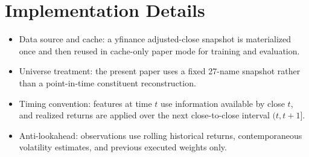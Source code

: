 \documentclass[10pt,twocolumn]{article}
\begin{document}
\section{Implementation Details}
\label{app:implementation_details}
\begin{itemize}[leftmargin=*,itemsep=1pt]
\item Data source and cache: a yfinance adjusted-close snapshot is materialized once and then reused in cache-only paper mode for training and evaluation.
\item Universe treatment: the present paper uses a fixed 27-name snapshot rather than a point-in-time constituent reconstruction.
\item Timing convention: features at time $t$ use information available by close $t$, and realized returns are applied over the next close-to-close interval $(t,t+1]$.
\item Anti-lookahead: observations use rolling historical returns, contemporaneous volatility estimates, and previous executed weights only.
\end{itemize}
\end{document}

